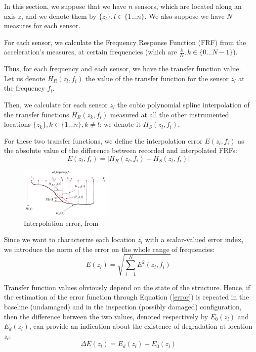 \documentclass[journal]{IEEEtran}
\begin{document}
In this section, we suppose that we have $n$ sensors, which are located along an axis $z$, and we denote them by
$\{z_l\}, l\in \{1 ... n\}$. We also suppose we have $N$ measures for each sensor.

For each sensor, we calculate the Frequency Response Function (FRF) from the acceleration's measures, at certain frequencies 
(which are $\frac{k}{N}, k \in \{0 ... N-1\}$).

Thus, for each frequency and each sensor, we have the transfer function value. Let us denote $H_R(z_l,f_i)$ the value of the transfer function for  the sensor $z_l$ at the frequency $f_i$.

Then, we calculate for each sensor $z_l$ the cubic polynomial spline interpolation of the transfer functions $H_R(z_k,f_i)$ measured at all 
the other instrumented locations $\{z_k\}, k\in \{1 ... n\}, k \neq l$: we denote it $H_S(z_l,f_i)$.

For these two transfer functions, we define the interpolation error $E(z_l,f_i)$ as the absolute value of the difference between recorded and interpolated FRFs:
\begin{equation}
E(z_l,f_i) = | H_R(z_l,f_i) - H_S(z_l,f_i) |
\end{equation}


\begin{figure}
  \centering
  \includegraphics[width=0.4\textwidth]{images/interpolation.png}
  \caption{Interpolation error, from \cite{dilena2015damage}}
  \label{interpolation_error}
\end{figure}


Since we want to characterize each location $z_l$ with a scalar-valued error index, we introduce the norm of the error on the whole range of
frequencies:
\begin{equation}
E(z_l) = \sqrt{  \sum\limits_{i=1}^N  E^2(z_l,f_i) }
\label{error}
\end{equation}


Transfer function values obviously depend on the state of the structure. Hence, if the estimation of the error function
through Equation (\ref{error}) is repeated in the baseline (undamaged) and in the inspection (possibly damaged) configuration, then the
difference between the two values, denoted respectively by $E_0(z_l)$ and $E_d(z_l)$, can provide an indication about the existence of
degradation at location $z_l$:
\begin{equation}
\Delta E(z_l) = E_d(z_l) - E_0(z_l)
\end{equation}
\end{document}
